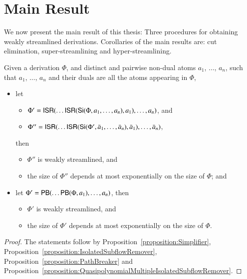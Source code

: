 \section{Main Result}\label{section:MainResult}


We now present the main result of this thesis: Three procedures for obtaining weakly streamlined derivations. Corollaries of the main results are: cut elimination, super-streamlining and hyper-streamlining.

\begin{theorem}\label{theorem:WeakStreamlining}
Given a derivation $\Phi$, and distinct and pairwise non-dual atoms $a_1$, $\dots$, $a_n$, such that $a_1$, $\dots$, $a_n$ and their duals are all the atoms appearing in $\Phi$,
\begin{itemize}
\item let
\begin{itemize}
\item $\Phi'=\mathsf{ISR}(\dots\mathsf{ISR}(\mathsf{Si}(\Phi,a_1,\dots,a_n),a_1),\dots,a_n)$, and
\item $\Phi''=\mathsf{ISR}(\dots\mathsf{ISR}(\mathsf{Si}(\Phi',\bar a_1,\dots,\bar a_n),\bar a_1),\dots,\bar a_n)$,
\end{itemize}
then
\begin{itemize}
\item $\Phi''$ is weakly streamlined, and
\item the size of $\Phi''$ depends at most exponentially on the size of\/ $\Phi$; and
\end{itemize}
\item let\/ $\Phi'=\mathsf{PB}(\dots\mathsf{PB}(\Phi,a_1),\dots,a_n)$, then
\begin{itemize}
\item $\Phi'$ is weakly streamlined, and
\item the size of\/ $\Phi'$ depends at most exponentially on the size of\/ $\Phi$.
\end{itemize}
\end{itemize}
\end{theorem}

\begin{proof}
The statements follow by Proposition~\vref{proposition:Simplifier}, Proposition~\vref{proposition:IsolatedSubflowRemover}, Proposition~\vref{proposition:PathBreaker} and Proposition~\vref{proposition:QuasipolynomialMultipleIsolatedSubflowRemover}.
\end{proof}

